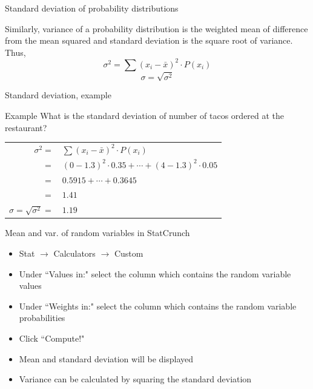 \documentclass[xcolor=table, handout]{beamer}
\begin{document}
\begin{frame}{Standard deviation of probability distributions}
\begin{block}{}
Similarly, variance of a probability distribution is the weighted mean of difference from the mean squared and standard deviation is the square root of variance.\\
\medskip
Thus,
\[\sigma^2 = \sum (x_i - \bar x )^2 \cdot P(x_i)\]
\[\sigma = \sqrt{\sigma^2}\]
\end{block}
\end{frame}

\begin{frame}{Standard deviation, example}
\begin{exampleblock}{Example}
What is the standard deviation of number of tacos ordered at the restaurant?\\
\medskip
\pause
{\centering \renewcommand{\arraystretch}{1}
\begin{tabular}{r l}
$\sigma^2 =$ & $\sum (x_i - \bar x )^2 \cdot P(x_i)$\\
$=$ & $(0-1.3)^2 \cdot 0.35 + \cdots + (4-1.3)^2 \cdot 0.05$\\
$=$ & $0.5915 + \cdots + 0.3645$\\
$=$ & $1.41$\\
\pause$\sigma = \sqrt{\sigma^2} = $ & $1.19$
\end{tabular}\par
\renewcommand{\arraystretch}{1.5}}
\end{exampleblock}
\end{frame}

\begin{frame}{Mean and var. of random variables in StatCrunch}
\begin{block}{}
\begin{itemize}
\item Stat $\to$ Calculators $\to$ Custom
\item Under ``Values in:" select the column which contains the random variable values
\item Under ``Weights in:" select the column which contains the random variable probabilities
\item Click ``Compute!"
\item Mean and standard deviation will be displayed
\item Variance can be calculated by squaring the standard deviation
\end{itemize}
\end{block}
\end{frame}
\end{document}
